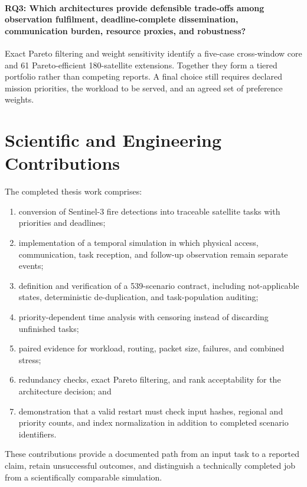 \paragraph{RQ3: Which architectures provide defensible trade-offs among observation fulfilment, deadline-complete dissemination, communication burden, resource proxies, and robustness?} Exact Pareto filtering and weight sensitivity identify a five-case cross-window core and 61 Pareto-efficient 180-satellite extensions. Together they form a tiered portfolio rather than competing reports. A final choice still requires declared mission priorities, the workload to be served, and an agreed set of preference weights.

\section{Scientific and Engineering Contributions}

The completed thesis work comprises:

\begin{enumerate}
\item conversion of Sentinel-3 fire detections into traceable satellite tasks with priorities and deadlines;
\item implementation of a temporal simulation in which physical access, communication, task reception, and follow-up observation remain separate events;
\item definition and verification of a 539-scenario contract, including not-applicable states, deterministic de-duplication, and task-population auditing;
\item priority-dependent time analysis with censoring instead of discarding unfinished tasks;
\item paired evidence for workload, routing, packet size, failures, and combined stress;
\item redundancy checks, exact Pareto filtering, and rank acceptability for the architecture decision; and
\item demonstration that a valid restart must check input hashes, regional and priority counts, and index normalization in addition to completed scenario identifiers.
\end{enumerate}

These contributions provide a documented path from an input task to a reported claim, retain unsuccessful outcomes, and distinguish a technically completed job from a scientifically comparable simulation.


